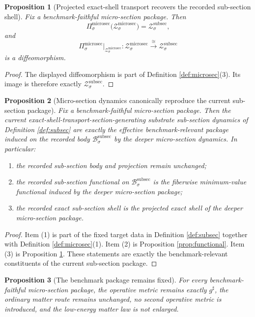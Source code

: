 \documentclass[11pt]{article}
\newcommand{\CompletedMetric}{g^{\sharp}}
\newcommand{\SubSectionBody}[1]{\mathcal B_{#1}^{\mathrm{subsec}}}
\newcommand{\SubSectionShell}[1]{\mathcal Z_{#1}^{\mathrm{subsec}}}
\newcommand{\MicroSectionProj}[1]{\Pi_{#1}^{\mathrm{microsec}}}
\newcommand{\MicroSectionShell}[1]{\mathcal Z_{#1}^{\mathrm{microsec}}}
\newtheorem{proposition}{Proposition}
\begin{document}
\begin{proposition}[Projected exact-shell transport recovers the recorded sub-section shell]
\label{prop:shell}
Fix a benchmark-faithful micro-section package. Then
\[
\MicroSectionProj{\sigma}\bigl(\MicroSectionShell{\sigma}\bigr)
=
\SubSectionShell{\sigma},
\]
and
\[
\MicroSectionProj{\sigma}\big|_{\MicroSectionShell{\sigma}}
:
\MicroSectionShell{\sigma}\xrightarrow{\cong}\SubSectionShell{\sigma}
\]
is a diffeomorphism.
\end{proposition}

\begin{proof}
The displayed diffeomorphism is part of Definition \ref{def:microsec}(3). Its image is therefore exactly \(\SubSectionShell{\sigma}\).
\end{proof}

\begin{proposition}[Micro-section dynamics canonically reproduce the current sub-section package]
\label{prop:package}
Fix a benchmark-faithful micro-section package. Then the current exact-shell-transport-section-generating substrate sub-section dynamics of Definition \ref{def:subsec} are exactly the effective benchmark-relevant package induced on the recorded body \(\SubSectionBody{\sigma}\) by the deeper micro-section dynamics. In particular:
\begin{enumerate}
    \item the recorded sub-section body and projection remain unchanged;
    \item the recorded sub-section functional on \(\SubSectionBody{\sigma}\) is the fiberwise minimum-value functional induced by the deeper micro-section package;
    \item the recorded exact sub-section shell is the projected exact shell of the deeper micro-section package.
\end{enumerate}
\end{proposition}

\begin{proof}
Item (1) is part of the fixed target data in Definition \ref{def:subsec} together with Definition \ref{def:microsec}(1). Item (2) is Proposition \ref{prop:functional}. Item (3) is Proposition \ref{prop:shell}. These statements are exactly the benchmark-relevant constituents of the current sub-section package.
\end{proof}

\begin{proposition}[The benchmark package remains fixed]
\label{prop:boundary}
For every benchmark-faithful micro-section package, the operative metric remains exactly \(\CompletedMetric\), the ordinary matter route remains unchanged, no second operative metric is introduced, and the low-energy matter law is not enlarged.
\end{proposition}
\end{document}
